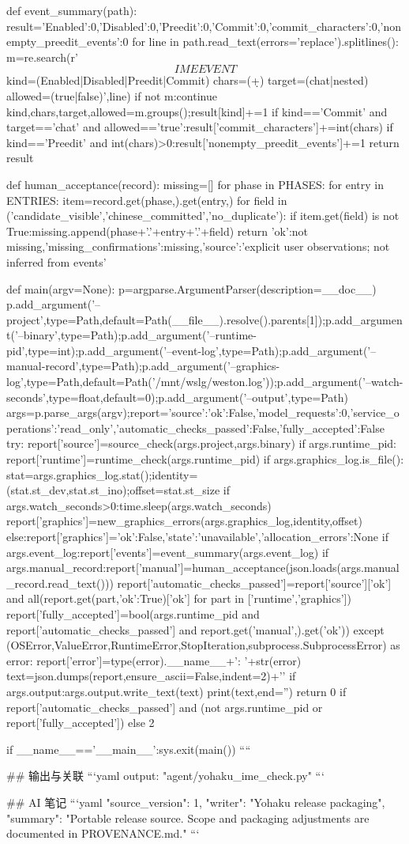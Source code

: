 def event_summary(path):
    result={'Enabled':0,'Disabled':0,'Preedit':0,'Commit':0,'commit_characters':0,'nonempty_preedit_events':0}
    for line in path.read_text(errors='replace').splitlines():
        m=re.search(r'\[IME EVENT\] kind=(Enabled|Disabled|Preedit|Commit) chars=(\d+) target=(chat|nested) allowed=(true|false)',line)
        if not m:continue
        kind,chars,target,allowed=m.groups();result[kind]+=1
        if kind=='Commit' and target=='chat' and allowed=='true':result['commit_characters']+=int(chars)
        if kind=='Preedit' and int(chars)>0:result['nonempty_preedit_events']+=1
    return result

def human_acceptance(record):
    missing=[]
    for phase in PHASES:
        for entry in ENTRIES:
            item=record.get(phase,{}).get(entry,{})
            for field in ('candidate_visible','chinese_committed','no_duplicate'):
                if item.get(field) is not True:missing.append(phase+'.'+entry+'.'+field)
    return {'ok':not missing,'missing_confirmations':missing,'source':'explicit user observations; not inferred from events'}

def main(argv=None):
    p=argparse.ArgumentParser(description=__doc__)
    p.add_argument('--project',type=Path,default=Path(__file__).resolve().parents[1]);p.add_argument('--binary',type=Path);p.add_argument('--runtime-pid',type=int);p.add_argument('--event-log',type=Path);p.add_argument('--manual-record',type=Path);p.add_argument('--graphics-log',type=Path,default=Path('/mnt/wslg/weston.log'));p.add_argument('--watch-seconds',type=float,default=0);p.add_argument('--output',type=Path)
    args=p.parse_args(argv);report={'source':{'ok':False},'model_requests':0,'service_operations':'read_only','automatic_checks_passed':False,'fully_accepted':False}
    try:
        report['source']=source_check(args.project,args.binary)
        if args.runtime_pid:
            report['runtime']=runtime_check(args.runtime_pid)
            if args.graphics_log.is_file():
                stat=args.graphics_log.stat();identity=(stat.st_dev,stat.st_ino);offset=stat.st_size
                if args.watch_seconds>0:time.sleep(args.watch_seconds)
                report['graphics']=new_graphics_errors(args.graphics_log,identity,offset)
            else:report['graphics']={'ok':False,'state':'unavailable','allocation_errors':None}
        if args.event_log:report['events']=event_summary(args.event_log)
        if args.manual_record:report['manual']=human_acceptance(json.loads(args.manual_record.read_text()))
        report['automatic_checks_passed']=report['source']['ok'] and all(report.get(part,{'ok':True})['ok'] for part in ['runtime','graphics'])
        report['fully_accepted']=bool(args.runtime_pid and report['automatic_checks_passed'] and report.get('manual',{}).get('ok'))
    except (OSError,ValueError,RuntimeError,StopIteration,subprocess.SubprocessError) as error:
        report['error']=type(error).__name__+': '+str(error)
    text=json.dumps(report,ensure_ascii=False,indent=2)+'\n'
    if args.output:args.output.write_text(text)
    print(text,end='')
    return 0 if report['automatic_checks_passed'] and (not args.runtime_pid or report['fully_accepted']) else 2

if __name__=='__main__':sys.exit(main())
````

## 输出与关联
```yaml
output: "agent/yohaku_ime_check.py"
```

## AI 笔记
```yaml
{"source_version": 1, "writer": "Yohaku release packaging", "summary": "Portable release source. Scope and packaging adjustments are documented in PROVENANCE.md."}
```
